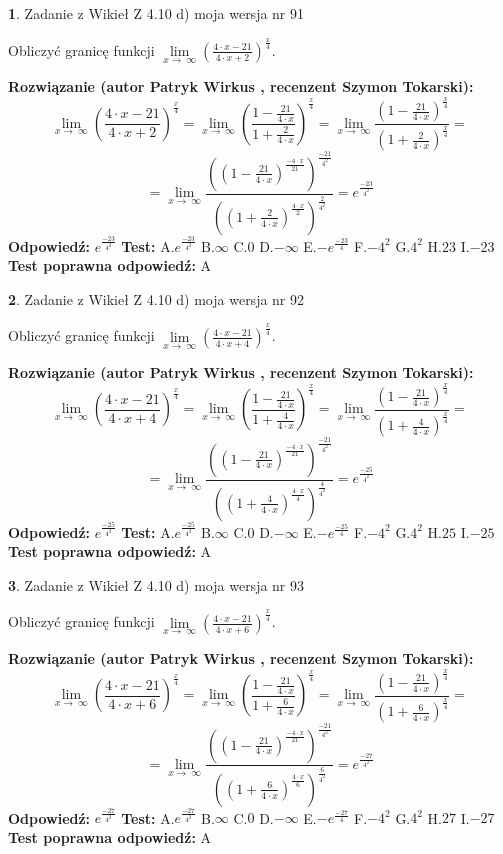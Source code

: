 \documentclass[12pt, a4paper]{article}
\theoremstyle{definition} %
\newtheorem{zad}{}
\newcommand{\zadStart}[1]{\begin{zad}#1\newline}
\newcommand{\zadStop}{\end{zad}}
\newcommand{\rozwStart}[2]{\noindent \textbf{Rozwiązanie (autor #1 , recenzent #2): }\newline}
\newcommand{\rozwStop}{\newline}
\newcommand{\odpStart}{\noindent \textbf{Odpowiedź:}\newline}
\newcommand{\odpStop}{\newline}
\newcommand{\testStart}{\noindent \textbf{Test:}\newline}
\newcommand{\testStop}{\newline}
\newcommand{\kluczStart}{\noindent \textbf{Test poprawna odpowiedź:}\newline}
\newcommand{\kluczStop}{\newline}
\begin{document}
\zadStart{Zadanie z Wikieł Z 4.10 d) moja wersja nr 91}


Obliczyć granicę funkcji  $\lim\limits_{x\to\ \infty}(\frac{4\cdot x-21}{4\cdot x+2})^{\frac{x}{4}}$.
\zadStop
\rozwStart{Patryk Wirkus}{Szymon Tokarski}
$$\lim\limits_{x\to\ \infty}(\frac{4\cdot x-21}{4\cdot x+2})^{\frac{x}{4}} = \lim\limits_{x\to\ \infty}(\frac{1-\frac{21}{4\cdot x}}{1+\frac{2}{4\cdot x}})^{\frac{x}{4}}=\lim\limits_{x\to\ \infty}\frac{(1-\frac{21}{4\cdot x})^{\frac{x}{4}}}{(1+\frac{2}{4\cdot x})^{\frac{x}{4}}}=$$
$$=\lim\limits_{x\to\ \infty}\frac{((1-\frac{21}{4\cdot x})^{\frac{-4\cdot x}{21}})^{\frac{-21}{4^{2}}}}{((1+\frac{2}{4\cdot x})^{\frac{4\cdot x}{2}})^{\frac{2}{4^{2}}}}=e^{\frac{-23}{4^{2}}}$$
\rozwStop
\odpStart
$e^{\frac{-23}{4^{2}}}$
\odpStop
\testStart
A.$e^{\frac{-23}{4^{2}}}$ B.$\infty$ C.$0$ D.$-\infty$ E.$-e^{\frac{-23}{4}}$
F.$-4^{2}$ G.$4^{2}$
H.$23$
I.$-23$
\testStop
\kluczStart
A
\kluczStop



\zadStart{Zadanie z Wikieł Z 4.10 d) moja wersja nr 92}


Obliczyć granicę funkcji  $\lim\limits_{x\to\ \infty}(\frac{4\cdot x-21}{4\cdot x+4})^{\frac{x}{4}}$.
\zadStop
\rozwStart{Patryk Wirkus}{Szymon Tokarski}
$$\lim\limits_{x\to\ \infty}(\frac{4\cdot x-21}{4\cdot x+4})^{\frac{x}{4}} = \lim\limits_{x\to\ \infty}(\frac{1-\frac{21}{4\cdot x}}{1+\frac{4}{4\cdot x}})^{\frac{x}{4}}=\lim\limits_{x\to\ \infty}\frac{(1-\frac{21}{4\cdot x})^{\frac{x}{4}}}{(1+\frac{4}{4\cdot x})^{\frac{x}{4}}}=$$
$$=\lim\limits_{x\to\ \infty}\frac{((1-\frac{21}{4\cdot x})^{\frac{-4\cdot x}{21}})^{\frac{-21}{4^{2}}}}{((1+\frac{4}{4\cdot x})^{\frac{4\cdot x}{4}})^{\frac{4}{4^{2}}}}=e^{\frac{-25}{4^{2}}}$$
\rozwStop
\odpStart
$e^{\frac{-25}{4^{2}}}$
\odpStop
\testStart
A.$e^{\frac{-25}{4^{2}}}$ B.$\infty$ C.$0$ D.$-\infty$ E.$-e^{\frac{-25}{4}}$
F.$-4^{2}$ G.$4^{2}$
H.$25$
I.$-25$
\testStop
\kluczStart
A
\kluczStop



\zadStart{Zadanie z Wikieł Z 4.10 d) moja wersja nr 93}


Obliczyć granicę funkcji  $\lim\limits_{x\to\ \infty}(\frac{4\cdot x-21}{4\cdot x+6})^{\frac{x}{4}}$.
\zadStop
\rozwStart{Patryk Wirkus}{Szymon Tokarski}
$$\lim\limits_{x\to\ \infty}(\frac{4\cdot x-21}{4\cdot x+6})^{\frac{x}{4}} = \lim\limits_{x\to\ \infty}(\frac{1-\frac{21}{4\cdot x}}{1+\frac{6}{4\cdot x}})^{\frac{x}{4}}=\lim\limits_{x\to\ \infty}\frac{(1-\frac{21}{4\cdot x})^{\frac{x}{4}}}{(1+\frac{6}{4\cdot x})^{\frac{x}{4}}}=$$
$$=\lim\limits_{x\to\ \infty}\frac{((1-\frac{21}{4\cdot x})^{\frac{-4\cdot x}{21}})^{\frac{-21}{4^{2}}}}{((1+\frac{6}{4\cdot x})^{\frac{4\cdot x}{6}})^{\frac{6}{4^{2}}}}=e^{\frac{-27}{4^{2}}}$$
\rozwStop
\odpStart
$e^{\frac{-27}{4^{2}}}$
\odpStop
\testStart
A.$e^{\frac{-27}{4^{2}}}$ B.$\infty$ C.$0$ D.$-\infty$ E.$-e^{\frac{-27}{4}}$
F.$-4^{2}$ G.$4^{2}$
H.$27$
I.$-27$
\testStop
\kluczStart
A
\kluczStop
\end{document}
